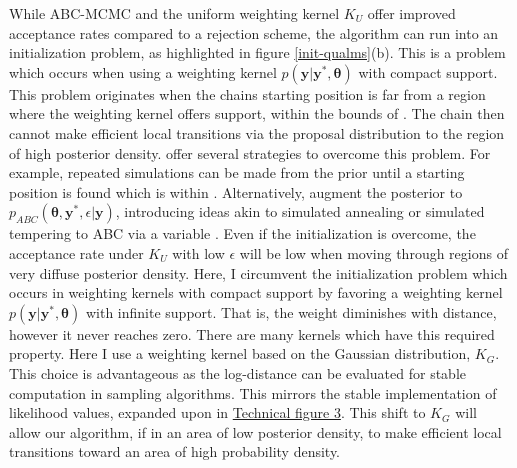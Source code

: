 While ABC-MCMC and the uniform weighting kernel $K_U$ offer improved acceptance rates compared to a rejection scheme, the algorithm can run into an initialization problem, as highlighted in figure \ref{init-qualms}(b). This is a problem which occurs when using a weighting kernel $p(\bm{y}|\bm{y^*},\bm{\theta})$ with compact support. This problem originates when the chains starting position is far from a region where the weighting kernel offers support, within the bounds of \pm\epsilon. The chain then cannot make efficient local transitions via the proposal distribution to the region of high posterior density. \citet{Sisson2010a} offer several strategies to overcome this problem. For example, repeated simulations can be made from the prior until a starting position is found which is within \pm \epsilon. Alternatively, \citet{Bortot2007} augment the posterior to $p_{ABC}(\bm{\theta},\bm{y^*},\epsilon|\bm{y})$, introducing ideas akin to simulated annealing or simulated tempering to ABC via a variable \epsilon. Even if the initialization is overcome, the acceptance rate under $K_U$ with low $\epsilon$ will be low when moving through regions of very diffuse posterior density.
Here, I circumvent the initialization problem which occurs in weighting kernels with compact support by favoring a weighting kernel $p(\bm{y}|\bm{y^*},\bm{\theta})$ with infinite support. That is, the weight diminishes with distance, however it never reaches zero. There are many kernels which have this required property. Here I use a weighting kernel based on the Gaussian distribution, $K_G$. This choice is advantageous as the log-distance can be evaluated for stable computation in sampling algorithms. This mirrors the stable implementation of likelihood values, expanded upon in \hyperref[tf3]{Technical figure 3}. This shift to $K_G$ will allow our algorithm, if in an area of low posterior density, to make efficient local transitions toward an area of high probability density.\par

